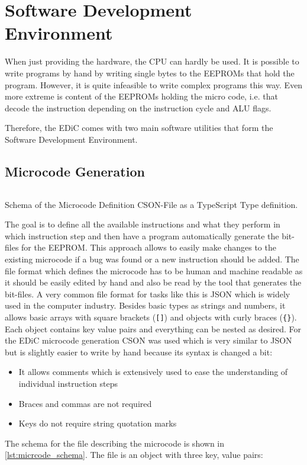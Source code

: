 \chapter{Software Development Environment}\label{cha:software}
When just providing the hardware, the \gls{CPU} can hardly be used.
It is possible to write programs by hand by writing single bytes to the \glspl{EEPROM} that hold the program.
However, it is quite infeasible to write complex programs this way.
Even more extreme is content of the \glspl{EEPROM} holding the micro code, i.e. that decode the instruction depending on the instruction cycle and \gls{ALU} flags.

Therefore, the \gls{EDiC} comes with two main software utilities that form the Software Development Environment.

\section{Microcode Generation}
\begin{listing}[t]
  \inputminted[linenos,
    breaklines,
    frame=leftline,
    xleftmargin=20pt,
  ]{TypeScript}{src/microcode.ts}
  \caption{Schema of the Microcode Definition CSON-File \cite{CSON} as a TypeScript \cite{TS} Type definition.}
  \label{lst:micrcode_schema}
\end{listing}
The goal is to define all the available instructions and what they perform in which instruction step and then have a program automatically generate the bit-files for the \gls{EEPROM}.
This approach allows to easily make changes to the existing microcode if a bug was found or a new instruction should be added.
The file format which defines the microcode has to be human and machine readable as it should be easily edited by hand and also be read by the tool that generates the bit-files.
A very common file format for tasks like this is \gls{JSON} \cite{JSON} which is widely used in the computer industry.
Besides basic types as strings and numbers, it allows basic arrays with square brackets (\texttt{[]}) and objects with curly braces (\texttt{\{\}}).
Each object contains key value pairs and everything can be nested as desired.
For the \gls{EDiC} microcode generation \gls{CSON} was used which is very similar to \gls{JSON} but is slightly easier to write by hand because its syntax is changed a bit:
\begin{itemize}
  \item It allows comments which is extensively used to ease the understanding of individual instruction steps
  \item Braces and commas are not required
  \item Keys do not require string quotation marks
\end{itemize}
The schema for the file describing the microcode is shown in \cref{lst:micrcode_schema}.
The file is an object with three key, value pairs:
